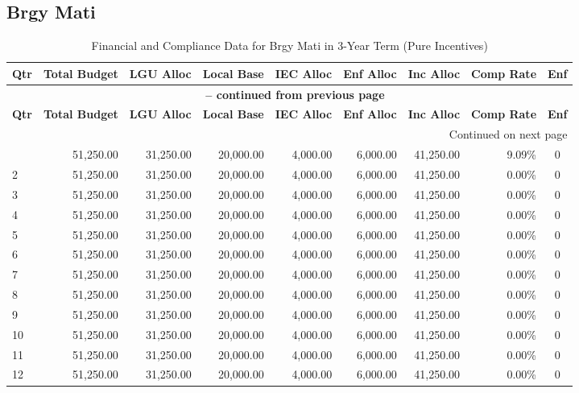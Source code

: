 \subsection{Brgy Mati}
\begin{longtable}{lrrrrrrrc}
\caption{Financial and Compliance Data for Brgy Mati in 3-Year Term (Pure Incentives)} \\
\toprule
\textbf{Qtr} & \textbf{Total Budget} & \textbf{LGU Alloc} & \textbf{Local Base} & \textbf{IEC Alloc} & \textbf{Enf Alloc} & \textbf{Inc Alloc} & \textbf{Comp Rate} & \textbf{Enf} \\
\midrule
\endfirsthead
\multicolumn{9}{c}{{\bfseries \tablename\ \thetable{} -- continued from previous page}} \\
\toprule
\textbf{Qtr} & \textbf{Total Budget} & \textbf{LGU Alloc} & \textbf{Local Base} & \textbf{IEC Alloc} & \textbf{Enf Alloc} & \textbf{Inc Alloc} & \textbf{Comp Rate} & \textbf{Enf} \\
\midrule
\endhead
\hline \multicolumn{9}{r}{{Continued on next page}} \\ \hline
\endfoot
\bottomrule
\endlastfoot
1 & 51,250.00 & 31,250.00 & 20,000.00 & 4,000.00 & 6,000.00 & 41,250.00 & 9.09\% & 0 \\
2 & 51,250.00 & 31,250.00 & 20,000.00 & 4,000.00 & 6,000.00 & 41,250.00 & 0.00\% & 0 \\
3 & 51,250.00 & 31,250.00 & 20,000.00 & 4,000.00 & 6,000.00 & 41,250.00 & 0.00\% & 0 \\
4 & 51,250.00 & 31,250.00 & 20,000.00 & 4,000.00 & 6,000.00 & 41,250.00 & 0.00\% & 0 \\
5 & 51,250.00 & 31,250.00 & 20,000.00 & 4,000.00 & 6,000.00 & 41,250.00 & 0.00\% & 0 \\
6 & 51,250.00 & 31,250.00 & 20,000.00 & 4,000.00 & 6,000.00 & 41,250.00 & 0.00\% & 0 \\
7 & 51,250.00 & 31,250.00 & 20,000.00 & 4,000.00 & 6,000.00 & 41,250.00 & 0.00\% & 0 \\
8 & 51,250.00 & 31,250.00 & 20,000.00 & 4,000.00 & 6,000.00 & 41,250.00 & 0.00\% & 0 \\
9 & 51,250.00 & 31,250.00 & 20,000.00 & 4,000.00 & 6,000.00 & 41,250.00 & 0.00\% & 0 \\
10 & 51,250.00 & 31,250.00 & 20,000.00 & 4,000.00 & 6,000.00 & 41,250.00 & 0.00\% & 0 \\
11 & 51,250.00 & 31,250.00 & 20,000.00 & 4,000.00 & 6,000.00 & 41,250.00 & 0.00\% & 0 \\
12 & 51,250.00 & 31,250.00 & 20,000.00 & 4,000.00 & 6,000.00 & 41,250.00 & 0.00\% & 0 \\
\end{longtable}
\newpage
